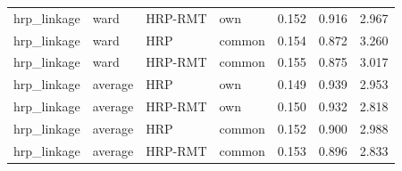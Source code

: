 \begin{table}[t]
{\begin{tabular}{llllrrr}
hrp\_linkage & ward & HRP-RMT & own & 0.152 & 0.916 & 2.967 \\
hrp\_linkage & ward & HRP & common & 0.154 & 0.872 & 3.260 \\
hrp\_linkage & ward & HRP-RMT & common & 0.155 & 0.875 & 3.017 \\
hrp\_linkage & average & HRP & own & 0.149 & 0.939 & 2.953 \\
hrp\_linkage & average & HRP-RMT & own & 0.150 & 0.932 & 2.818 \\
hrp\_linkage & average & HRP & common & 0.152 & 0.900 & 2.988 \\
hrp\_linkage & average & HRP-RMT & common & 0.153 & 0.896 & 2.833 \\
\bottomrule
\end{tabular}}
\end{table}
